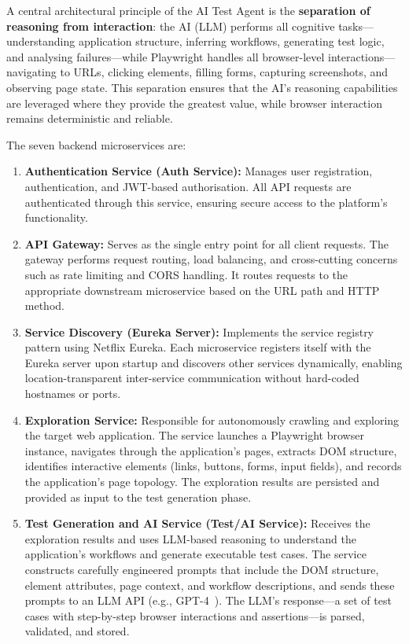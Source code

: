 A central architectural principle of the AI Test Agent is the \textbf{separation of reasoning from interaction}: the AI (LLM) performs all cognitive tasks---understanding application structure, inferring workflows, generating test logic, and analysing failures---while Playwright handles all browser-level interactions---navigating to URLs, clicking elements, filling forms, capturing screenshots, and observing page state. This separation ensures that the AI's reasoning capabilities are leveraged where they provide the greatest value, while browser interaction remains deterministic and reliable.

The seven backend microservices are:

\begin{enumerate}
    \item \textbf{Authentication Service (Auth Service):} Manages user registration, authentication, and JWT-based authorisation. All API requests are authenticated through this service, ensuring secure access to the platform's functionality.

    \item \textbf{API Gateway:} Serves as the single entry point for all client requests. The gateway performs request routing, load balancing, and cross-cutting concerns such as rate limiting and CORS handling. It routes requests to the appropriate downstream microservice based on the URL path and HTTP method.

    \item \textbf{Service Discovery (Eureka Server):} Implements the service registry pattern using Netflix Eureka. Each microservice registers itself with the Eureka server upon startup and discovers other services dynamically, enabling location-transparent inter-service communication without hard-coded hostnames or ports.

    \item \textbf{Exploration Service:} Responsible for autonomously crawling and exploring the target web application. The service launches a Playwright browser instance, navigates through the application's pages, extracts DOM structure, identifies interactive elements (links, buttons, forms, input fields), and records the application's page topology. The exploration results are persisted and provided as input to the test generation phase.

    \item \textbf{Test Generation and AI Service (Test/AI Service):} Receives the exploration results and uses LLM-based reasoning to understand the application's workflows and generate executable test cases. The service constructs carefully engineered prompts that include the DOM structure, element attributes, page context, and workflow descriptions, and sends these prompts to an LLM API (e.g., GPT-4~\cite{openai2023gpt4}). The LLM's response---a set of test cases with step-by-step browser interactions and assertions---is parsed, validated, and stored.


\end{enumerate}
